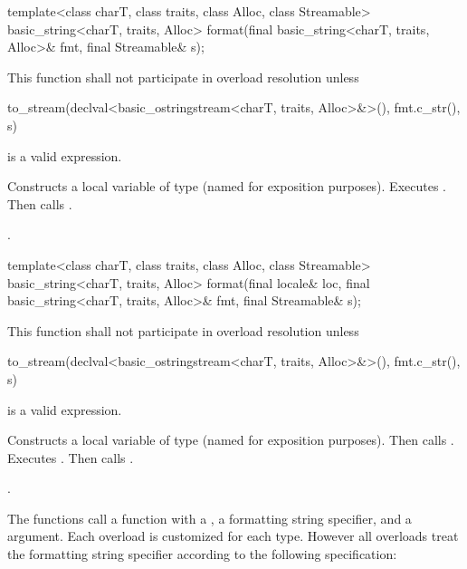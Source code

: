 \begin{itemdecl}
template<class charT, class traits, class Alloc, class Streamable>
  basic_string<charT, traits, Alloc>
    format(final basic_string<charT, traits, Alloc>& fmt, final Streamable& s);
\end{itemdecl}

\begin{itemdescr}
\pnum
\remarks
This function shall not participate in overload resolution unless
\begin{codeblock}
to_stream(declval<basic_ostringstream<charT, traits, Alloc>&>(), fmt.c_str(), s)
\end{codeblock}
is a valid expression.

\pnum
\effects
Constructs a local variable of type
(named  for exposition purposes).
Executes .
Then calls .

\pnum
\returns {}.
\end{itemdescr}

\begin{itemdecl}
template<class charT, class traits, class Alloc, class Streamable>
  basic_string<charT, traits, Alloc>
    format(final locale& loc, final basic_string<charT, traits, Alloc>& fmt, final Streamable& s);
\end{itemdecl}

\begin{itemdescr}
\pnum
\remarks
This function shall not participate in overload resolution unless
\begin{codeblock}
to_stream(declval<basic_ostringstream<charT, traits, Alloc>&>(), fmt.c_str(), s)
\end{codeblock}
is a valid expression.

\pnum
\effects
Constructs a local variable of type
(named  for exposition purposes).
Then calls .
Executes .
Then calls .

\pnum
\returns {}.
\end{itemdescr}

\pnum
The  functions call a  function with
a ,
a formatting string specifier,
and a  argument.
Each  overload is customized for each  type.
However all  overloads
treat the formatting string specifier
according to the following specification:

